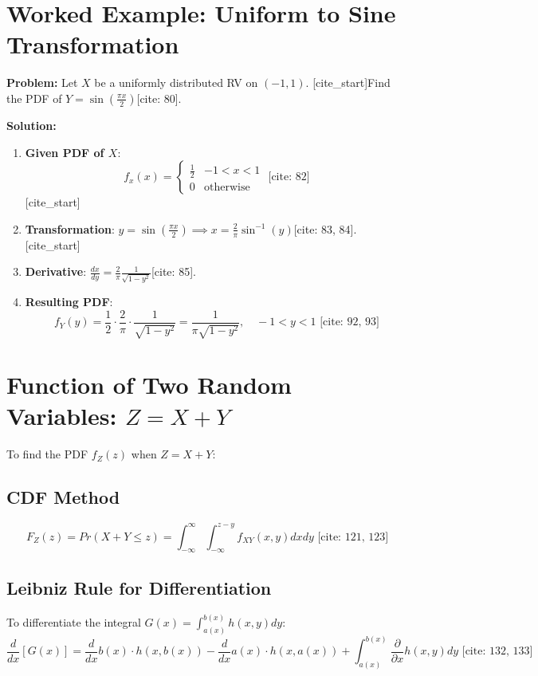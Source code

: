 \documentclass{article}
\begin{document}
\section{Worked Example: Uniform to Sine Transformation}
\textbf{Problem:} Let $X$ be a uniformly distributed RV on $(-1, 1)$. [cite_start]Find the PDF of $Y = \sin\left(\frac{\pi x}{2}\right)$[cite: 80].

\textbf{Solution:}
\begin{enumerate}
    \item \textbf{Given PDF of $X$}:
    \begin{equation}
        [cite_start]f_x(x) = \begin{cases} \frac{1}{2} & -1 < x < 1 \\ 0 & \text{otherwise} \end{cases} \text{ [cite: 82]}
    \end{equation}
    [cite_start]\item \textbf{Transformation}: $y = \sin\left(\frac{\pi x}{2}\right) \implies x = \frac{2}{\pi}\sin^{-1}(y)$[cite: 83, 84].
    [cite_start]\item \textbf{Derivative}: $\frac{dx}{dy} = \frac{2}{\pi} \frac{1}{\sqrt{1-y^2}}$[cite: 85].
    \item \textbf{Resulting PDF}:
    \begin{equation}
        [cite_start]f_Y(y) = \frac{1}{2} \cdot \frac{2}{\pi} \cdot \frac{1}{\sqrt{1-y^2}} = \frac{1}{\pi\sqrt{1-y^2}}, \quad -1 < y < 1 \text{ [cite: 92, 93]}
    \end{equation}
\end{enumerate}

\section{Function of Two Random Variables: $Z = X + Y$}
To find the PDF $f_Z(z)$ when $Z = X + Y$:

\subsection{CDF Method}
\begin{equation}
    [cite_start]F_Z(z) = Pr(X+Y \le z) = \int_{-\infty}^{\infty} \int_{-\infty}^{z-y} f_{XY}(x,y) dx dy \text{ [cite: 121, 123]}
\end{equation}

\subsection{Leibniz Rule for Differentiation}
To differentiate the integral $G(x) = \int_{a(x)}^{b(x)} h(x,y) dy$:
\begin{equation}
    [cite_start]\frac{d}{dx}[G(x)] = \frac{d}{dx}b(x) \cdot h(x, b(x)) - \frac{d}{dx}a(x) \cdot h(x, a(x)) + \int_{a(x)}^{b(x)} \frac{\partial}{\partial x} h(x,y) dy \text{ [cite: 132, 133]}
\end{equation}
\end{document}
